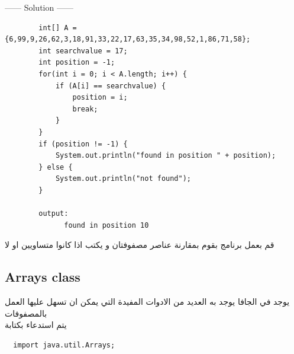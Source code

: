 \begin{example}
              
  \begin{center}
    ------ \textcolor{Solution}{Solution} ------ 
  \end{center}
  \begin{verbatim}
        int[] A = {6,99,9,26,62,3,18,91,33,22,17,63,35,34,98,52,1,86,71,58};
        int searchvalue = 17;
        int position = -1;
        for(int i = 0; i < A.length; i++) {
            if (A[i] == searchvalue) {
                position = i;
                break;
            }
        }
        if (position != -1) {
            System.out.println("found in position " + position);
        } else {
            System.out.println("not found");
        }

        output:
              found in position 10  
  \end{verbatim}
\end{example}
\begin{task}
  \begin{AR}
    قم بعمل برنامج بقوم بمقارنة عناصر مصفوفتان و يكتب اذا كانوا متساويين او لا 
  \end{AR}
\end{task}
\subsection{Arrays class}
\begin{AR}
يوجد في الجافا  يوجد به العديد من الادوات المفيدة التي يمكن ان تسهل عليها العمل بالمصفوفات
\\
يتم استدعاء بكتابة
\end{AR}
\begin{verbatim}
  import java.util.Arrays;
\end{verbatim}

